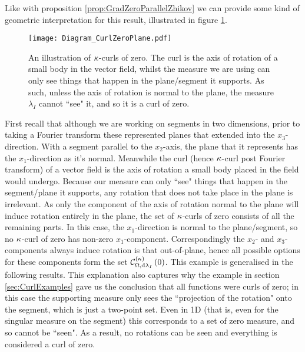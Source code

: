 Like with proposition \ref{prop:GradZeroParallelZhikov} we can provide some kind of geometric interpretation for this result, illustrated in figure \ref{fig:CurlZeroInterp}.
\begin{figure}[b!]
	\centering
	\texttt{[image: Diagram\_CurlZeroPlane.pdf]}
	\caption{\label{fig:CurlZeroInterp} An illustration of $\kappa$-curls of zero. The curl is the axis of rotation of a small body in the vector field, whilst the measure we are using can only see things that happen in the plane/segment it supports. As such, unless the axis of rotation is normal to the plane, the measure $\lambda_I$ cannot ``see" it, and so it is a curl of zero.}
\end{figure}
First recall that although we are working on segments in two dimensions, prior to taking a Fourier transform these represented planes that extended into the $x_3$-direction.
With a segment parallel to the $x_2$-axis, the plane that it represents has the $x_1$-direction as it's normal.
Meanwhile the curl (hence $\kappa$-curl post Fourier transform) of a vector field is the axis of rotation a small body placed in the field would undergo.
Because our measure can only ``see" things that happen in the segment/plane it supports, any rotation that does not take place in the plane is irrelevant.
As only the component of the axis of rotation normal to the plane will induce rotation entirely in the plane, the set of $\kappa$-curls of zero consists of all the remaining parts.
In this case, the $x_1$-direction is normal to the plane/segment, so no $\kappa$-curl of zero has non-zero $x_1$-component.
Correspondingly the $x_2$- and $x_3$-components always induce rotation is that out-of-plane, hence all possible options for these components form the set $\mathcal{C}_{ \Omega, \mathrm{d}\lambda_I}^{(\kappa)}\left( 0 \right)$.
This example is generalised in the following results. 
This explanation also captures why the example in section \ref{sec:CurlExamples} gave us the conclusion that all functions were curls of zero; in this case the supporting measure only sees the ``projection of the rotation" onto the segment, which is just a two-point set.
Even in 1D (that is, even for the singular measure on the segment) this corresponds to a set of zero measure, and so cannot be ``seen".
As a result, no rotations can be seen and everything is considered a curl of zero. \newline

